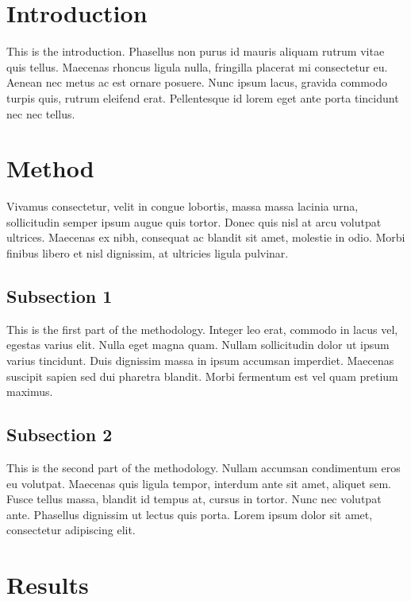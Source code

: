 \documentclass[12pt,a4paper,]{report}
\begin{document}
\hypertarget{introduction-3}{%
\section{Introduction}\label{introduction-3}}

This is the introduction. Phasellus non purus id mauris aliquam rutrum
vitae quis tellus. Maecenas rhoncus ligula nulla, fringilla placerat mi
consectetur eu. Aenean nec metus ac est ornare posuere. Nunc ipsum
lacus, gravida commodo turpis quis, rutrum eleifend erat. Pellentesque
id lorem eget ante porta tincidunt nec nec tellus.

\hypertarget{method-2}{%
\section{Method}\label{method-2}}

Vivamus consectetur, velit in congue lobortis, massa massa lacinia urna,
sollicitudin semper ipsum augue quis tortor. Donec quis nisl at arcu
volutpat ultrices. Maecenas ex nibh, consequat ac blandit sit amet,
molestie in odio. Morbi finibus libero et nisl dignissim, at ultricies
ligula pulvinar.

\hypertarget{subsection-1-1}{%
\subsection{Subsection 1}\label{subsection-1-1}}

This is the first part of the methodology. Integer leo erat, commodo in
lacus vel, egestas varius elit. Nulla eget magna quam. Nullam
sollicitudin dolor ut ipsum varius tincidunt. Duis dignissim massa in
ipsum accumsan imperdiet. Maecenas suscipit sapien sed dui pharetra
blandit. Morbi fermentum est vel quam pretium maximus.

\hypertarget{subsection-2-2}{%
\subsection{Subsection 2}\label{subsection-2-2}}

This is the second part of the methodology. Nullam accumsan condimentum
eros eu volutpat. Maecenas quis ligula tempor, interdum ante sit amet,
aliquet sem. Fusce tellus massa, blandit id tempus at, cursus in tortor.
Nunc nec volutpat ante. Phasellus dignissim ut lectus quis porta. Lorem
ipsum dolor sit amet, consectetur adipiscing elit.

\hypertarget{results-2}{%
\section{Results}\label{results-2}}
\end{document}
